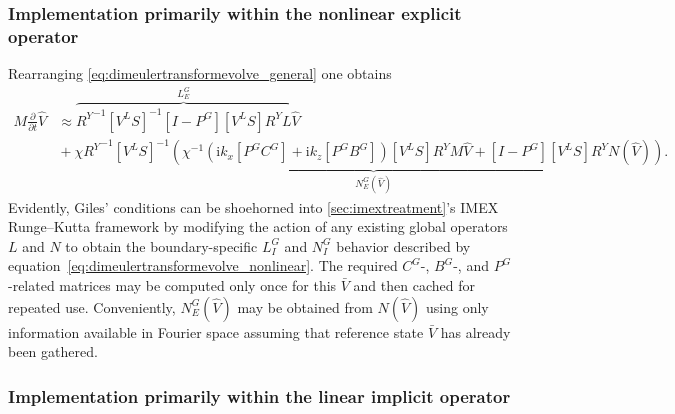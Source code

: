 \documentclass[letterpaper,11pt,nointlimits,reqno,draft]{amsbook}
\newcommand{\ii}{\ensuremath{\mathrm{i}}}
\begin{document}

\subsubsection{Implementation primarily within the nonlinear explicit operator}
\label{sec:nrbc_mostly_explicit}

Rearranging \eqref{eq:dimeulertransformevolve_general} one obtains
\begin{align}
\label{eq:dimeulertransformevolve_nonlinear}
  M \frac{\partial}{\partial{}t}
  \hat{V}
&\approx
\overbrace{
  {R^Y}^{-1}
  \left[V^L S\right]^{-1}
  \left[I-P^G\right] \left[V^L S\right] R^Y
  L
}^{L_E^G}
  \hat{V}
\\
&{}+
  \chi
\underbrace{
  {R^Y}^{-1}
  \left[V^L S\right]^{-1}
  \left(
    \chi^{-1}
    \left( \ii k_x \left[P^G C^G\right] + \ii k_z \left[P^G B^G\right] \right)
    \left[V^L S\right] R^Y M
    \hat{V}
    +
    \left[I - P^G\right] \left[V^L S\right] R^Y
    N(\hat{V})
  \right)
}_{N_E^G\left(\hat{V}\right)}
.
\end{align}
Evidently, Giles' conditions can be shoehorned into
\autoref{sec:imextreatment}'s IMEX Runge--Kutta framework by modifying the
action of any existing global operators $L$ and $N$ to obtain the
boundary-specific $L_I^G$ and $N_I^G$ behavior described by
equation~\eqref{eq:dimeulertransformevolve_nonlinear}. The required $C^G$-,
$B^G$-, and $P^G$-related matrices may be computed only once for this $\bar{V}$
and then cached for repeated use.  Conveniently, $N_E^G\left(\hat{V}\right)$ may
be obtained from $N\left(\hat{V}\right)$ using only information available in
Fourier space assuming that reference state $\bar{V}$ has already been gathered.

\subsubsection{Implementation primarily within the linear implicit operator}
\label{sec:nrbc_mostly_implicit}
\end{document}
